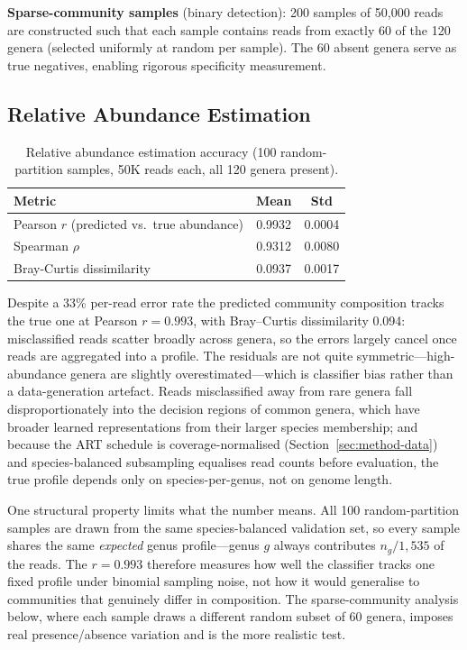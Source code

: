\textbf{Sparse-community samples} (binary detection): 200 samples of 50,000 reads are constructed such that each sample contains reads from exactly 60 of the 120 genera (selected uniformly at random per sample).
The 60 absent genera serve as true negatives, enabling rigorous specificity measurement.

\subsection{Relative Abundance Estimation}
\label{sec:sample-abundance}

\begin{table}[htbp]
    \centering
    \caption{Relative abundance estimation accuracy (100 random-partition samples, 50K reads each, all 120 genera present).}
    \label{tab:sample-abundance}
    \begin{tabular}{lcc}
        \toprule
        \textbf{Metric} & \textbf{Mean} & \textbf{Std} \\
        \midrule
        Pearson $r$ (predicted vs.\ true abundance) & 0.9932 & 0.0004 \\
        Spearman $\rho$ & 0.9312 & 0.0080 \\
        Bray-Curtis dissimilarity & 0.0937 & 0.0017 \\
        \bottomrule
    \end{tabular}
\end{table}

Despite a 33\% per-read error rate the predicted community composition tracks the true
one at Pearson $r = 0.993$, with Bray--Curtis dissimilarity 0.094: misclassified reads
scatter broadly across genera, so the errors largely cancel once reads are aggregated
into a profile. The residuals are not quite symmetric---high-abundance genera are
slightly overestimated---which is classifier bias rather than a data-generation
artefact. Reads misclassified away from rare genera fall disproportionately into the
decision regions of common genera, which have broader learned representations from
their larger species membership; and because the ART schedule is coverage-normalised
(Section~\ref{sec:method-data}) and species-balanced subsampling equalises read counts
before evaluation, the true profile depends only on species-per-genus, not on genome
length.

One structural property limits what the number means. All 100 random-partition samples
are drawn from the same species-balanced validation set, so every sample shares the
same \emph{expected} genus profile---genus $g$ always contributes $n_g/1{,}535$ of the
reads. The $r = 0.993$ therefore measures how well the classifier tracks one fixed
profile under binomial sampling noise, not how it would generalise to communities that
genuinely differ in composition. The sparse-community analysis below, where each sample
draws a different random subset of 60 genera, imposes real presence/absence variation
and is the more realistic test.

